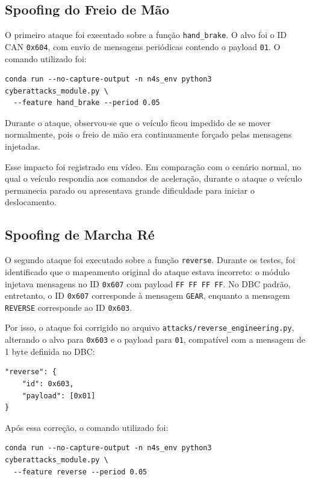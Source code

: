 \documentclass[12pt,a4paper]{article}
\begin{document}
\subsection{Spoofing do Freio de M\~ao}

O primeiro ataque foi executado sobre a fun\c{c}\~ao \texttt{hand\_brake}. O alvo foi o ID
CAN \texttt{0x604}, com envio de mensagens peri\'odicas contendo o payload \texttt{01}.
O comando utilizado foi:

\begin{verbatim}
conda run --no-capture-output -n n4s_env python3 cyberattacks_module.py \
  --feature hand_brake --period 0.05
\end{verbatim}

Durante o ataque, observou-se que o ve\'iculo ficou impedido de se mover normalmente,
pois o freio de m\~ao era continuamente for\c{c}ado pelas mensagens injetadas.

Esse impacto foi registrado em v\'ideo. Em compara\c{c}\~ao com o cen\'ario normal, no
qual o ve\'iculo respondia aos comandos de acelera\c{c}\~ao, durante o ataque o ve\'iculo
permanecia parado ou apresentava grande dificuldade para iniciar o deslocamento.

\subsection{Spoofing de Marcha R\'e}

O segundo ataque foi executado sobre a fun\c{c}\~ao \texttt{reverse}. Durante os testes,
foi identificado que o mapeamento original do ataque estava incorreto: o m\'odulo
injetava mensagens no ID \texttt{0x607} com payload \texttt{FF FF FF FF}. No DBC
padr\~ao, entretanto, o ID \texttt{0x607} corresponde \`a mensagem \texttt{GEAR}, enquanto
a mensagem \texttt{REVERSE} corresponde ao ID \texttt{0x603}.

Por isso, o ataque foi corrigido no arquivo \texttt{attacks/reverse\_engineering.py},
alterando o alvo para \texttt{0x603} e o payload para \texttt{01}, compat\'ivel com a
mensagem de 1 byte definida no DBC:

\begin{verbatim}
"reverse": {
    "id": 0x603,
    "payload": [0x01]
}
\end{verbatim}

Ap\'os essa corre\c{c}\~ao, o comando utilizado foi:

\begin{verbatim}
conda run --no-capture-output -n n4s_env python3 cyberattacks_module.py \
  --feature reverse --period 0.05
\end{verbatim}
\end{document}
